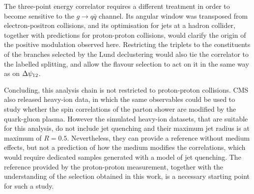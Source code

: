 The three-point energy correlator requires a different treatment in order to become 
sensitive to the $g \to q\bar{q}$ channel. Its angular window was transposed from
electron-positron collisions, and its optimisation for jets at a hadron collider,
together with predictions for proton-proton collisions, would clarify the origin
of the positive modulation observed here. Restricting the triplets to the
constituents of the branches selected by the Lund declustering would also tie the
correlator to the labelled splitting, and allow the flavour selection to act on
it in the same way as on $\Delta\psi_{12}$.

Concluding, this analysis chain is not restricted to proton-proton collisions.
CMS also released heavy-ion data, in which the same observables 
could be used to study whether the spin correlations of the parton shower are
modified by the quark-gluon plasma. However the simulated heavy-ion datasets, that 
are suitable for this analysis, do not include jet quenching and their maximum
jet radius is at maximum of $R=0.5$. Nevertheless,
they can provide a reference without medium effects, but not a prediction of how
the medium modifies the correlations, which would require dedicated samples
generated with a model of jet quenching. The reference provided by the
proton-proton measurement, together with the understanding of the selection
obtained in this work, is a necessary starting point for such a study.